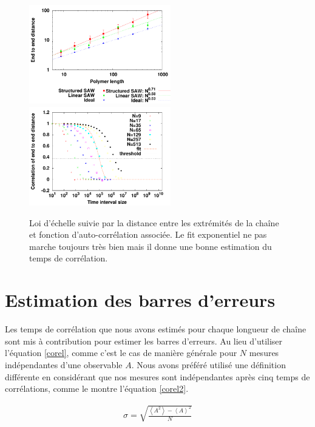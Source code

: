\documentclass[a4paper,11pt]{article}
\begin{document}
\begin{figure}[H]
\begin{center}
\includegraphics[width=0.55\textwidth]{endtoenddistance.pdf}
\includegraphics[width=0.55\textwidth]{correlendtoend.pdf}

\caption{Loi d'échelle suivie par la distance entre les extrémités de la chaîne et fonction d’auto-corrélation associée. Le fit exponentiel ne pas marche toujours très bien mais il donne une bonne estimation du temps de corrélation.}
\label{endtoend1}
\end{center}
\end{figure}

\section*{Estimation des barres d'erreurs}

Les temps de corrélation que nous avons estimés pour chaque longueur de chaîne sont mis à contribution pour estimer les barres d'erreurs. Au lieu d'utiliser l'équation \ref{corel},
 comme c'est le cas de manière générale pour $N$ mesures indépendantes d'une observable $A$. Nous avons préféré utilisé une définition différente en considérant que nos mesures sont indépendantes après cinq temps de corrélations, comme le montre l'équation \ref{corel2}.

\begin{eqnarray}
\sigma=\sqrt{\frac{\left<A^2\right>-\left<A\right>^2}{N}}
\label{corel}
\end{eqnarray}
\end{document}
